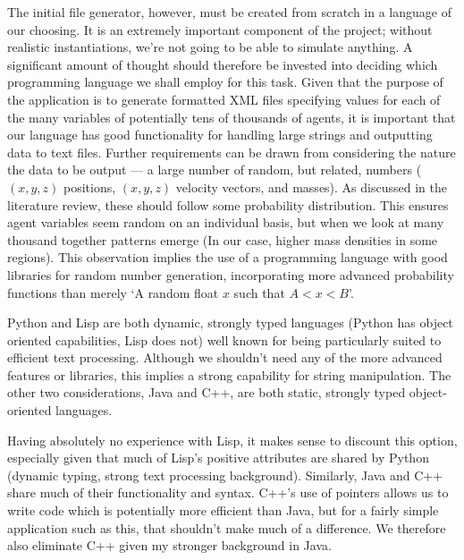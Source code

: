 \documentclass[11pt,a4paper]{article}
\begin{document}
The initial file generator, however, must be created from scratch in a language of our choosing. It is an extremely important component of the project; without realistic instantiations, we're not going to be able to simulate anything. A significant amount of thought should therefore be invested into deciding which programming language we shall employ for this task. Given that the purpose of the application is to generate formatted XML files specifying values for each of the many variables of potentially tens of thousands of agents, it is important that our language has good functionality for handling large strings and outputting data to text files. Further requirements can be drawn from considering the nature the data to be output --- a large number of random, but related, numbers ($(x,y,z)$ positions, $(x,y,z)$ velocity vectors, and masses). As discussed in the literature review, these should follow some probability distribution. This ensures agent variables seem random on an individual basis, but when we look at many thousand together patterns emerge (In our case, higher mass densities in some regions). This observation implies the use of a programming language with good libraries for random number generation, incorporating more advanced probability functions than merely `A random float $x$ such that $A<x<B$'.

Python and Lisp are both dynamic, strongly typed languages (Python has object oriented capabilities, Lisp does not) well known for being particularly suited to efficient text processing\cite{xxyyzz fix this? bad reference? wideFinder}. Although we shouldn't need any of the more advanced features or libraries, this implies a strong capability for string manipulation. The other two considerations, Java and C++, are both static, strongly typed object-oriented languages. 

Having absolutely no experience with Lisp, it makes sense to discount this option, especially given that much of Lisp's positive attributes are shared by Python (dynamic typing, strong text processing background). Similarly, Java and C++ share much of their functionality and syntax. C++'s use of pointers allows us to write code which is potentially more efficient than Java, but for a fairly simple application such as this, that shouldn't make much of a difference. We therefore also eliminate C++ given my stronger background in Java.
\end{document}

